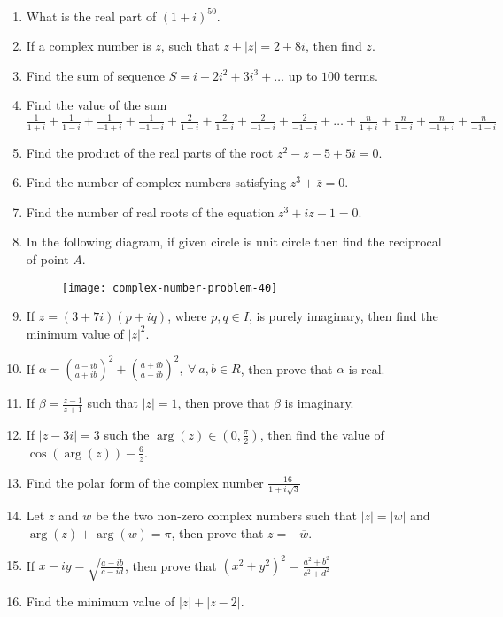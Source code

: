 \begin{enumerate}[resume]
\item What is the real part of $(1 + i)^{50}$.
\item If a complex number is $z$, such that $z + |z| = 2 + 8i$, then find $z$.
\item Find the sum of sequence $S = i + 2i^2 + 3i^3 + \ldots$ up to $100$ terms.
\item Find the value of the sum $\frac{1}{1 + i} + \frac{1}{1 - i} + \frac{1}{-1 + i} + \frac{1}{-1 -i} + \frac{2}{1 + i} +
  \frac{2}{1 - i} + \frac{2}{-1 + i} + \frac{2}{-1 -i} + \ldots + \frac{n}{1 + i} + \frac{n}{1 - i} + \frac{n}{-1 + i} +
  \frac{n}{-1 -i}$
\item Find the product of the real parts of the root $z^2 - z - 5 + 5i = 0$.
\item Find the number of complex numbers satisfying $z^3 + \overline{z} = 0$.
\item Find the number of real roots of the equation $z^3 + iz - 1= 0$.
\item In the following diagram, if given circle is unit circle then find the reciprocal of point $A.$
  \begin{figure}[H]
    \begin{center}
      \texttt{[image: complex-number-problem-40]}
    \end{center}
  \end{figure}
\item If $z = (3 + 7i)(p + iq)$, where $p, q\in I$, is purely imaginary, then find the minimum value of $|z|^2$.
\item If $\alpha = \left(\frac{a - ib}{a + ib}\right)^2 + \left(\frac{a + ib}{a - ib}\right)^2,~\forall~a, b\in R$, then prove that
  $\alpha$ is real.
\item If $\beta = \frac{z - 1}{z + 1}$ such that $|z| = 1$, then prove that $\beta$ is imaginary.
\item If $|z - 3i| = 3$ such the $\arg(z)\in\left(0, \frac{\pi}{2}\right)$, then find the value of $\cos(\arg(z)) - \frac{6}{z}$.
\item Find the polar form of the complex number $\frac{-16}{1 + i\sqrt{3}}$
\item Let $z$ and $w$ be the two non-zero complex numbers such that $|z| = |w|$ and $\arg(z) + \arg(w) = \pi$, then prove that $z =
  -\overline{w}$.
\item If $x - iy = \sqrt{\frac{a - ib}{c - id}}$, then prove that $(x^2 + y^2)^2 = \frac{a^2 + b^2}{c^2 + d^2}$
\item Find the minimum value of $|z| + |z - 2|$.

\end{enumerate}
